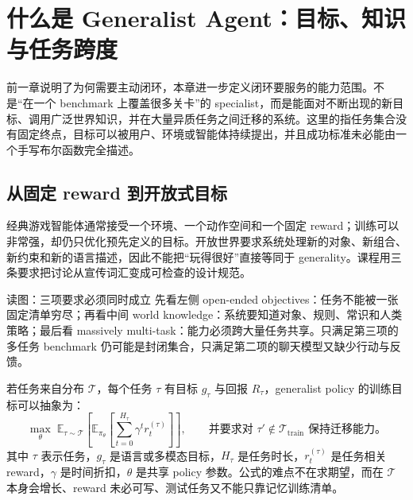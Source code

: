 \section{什么是 Generalist Agent：目标、知识与任务跨度}

前一章说明了为何需要主动闭环，本章进一步定义闭环要服务的能力范围。不是“在一个 benchmark 上覆盖很多关卡”的 specialist，而是能面对不断出现的新目标、调用广泛世界知识，并在大量异质任务之间迁移的系统。这里的指任务集合没有固定终点，目标可以被用户、环境或智能体持续提出，并且成功标准未必能由一个手写布尔函数完全描述。

\subsection{从固定 reward 到开放式目标}

经典游戏智能体通常接受一个环境、一个动作空间和一个固定 reward；训练可以非常强，却仍只优化预先定义的目标。开放世界要求系统处理新的对象、新组合、新约束和新的语言描述，因此不能把“玩得很好”直接等同于 generality。课程用三条要求把讨论从宣传词汇变成可检查的设计规范。


\begin{knowledgebox}{读图：三项要求必须同时成立}
先看左侧 open-ended objectives：任务不能被一张固定清单穷尽；再看中间 world knowledge：系统要知道对象、规则、常识和人类策略；最后看 massively multi-task：能力必须跨大量任务共享。只满足第三项的多任务 benchmark 仍可能是封闭集合，只满足第二项的聊天模型又缺少行动与反馈。
\end{knowledgebox}

若任务来自分布 $\mathcal{T}$，每个任务 $\tau$ 有目标 $g_\tau$ 与回报 $R_\tau$，generalist policy 的训练目标可以抽象为：
\[
\max_\theta\;\mathbb{E}_{\tau\sim\mathcal{T}}\left[\mathbb{E}_{\pi_\theta}\left[\sum_{t=0}^{H_\tau}\gamma^t r_t^{(\tau)}\right]\right],
\qquad \text{并要求对 }\tau'\notin\mathcal{T}_{\text{train}}\text{ 保持迁移能力。}
\]
其中 $\tau$ 表示任务，$g_\tau$ 是语言或多模态目标，$H_\tau$ 是任务时长，$r_t^{(\tau)}$ 是任务相关 reward，$\gamma$ 是时间折扣，$\theta$ 是共享 policy 参数。公式的难点不在求期望，而在 $\mathcal{T}$ 本身会增长、reward 未必可写、测试任务又不能只靠记忆训练清单。


